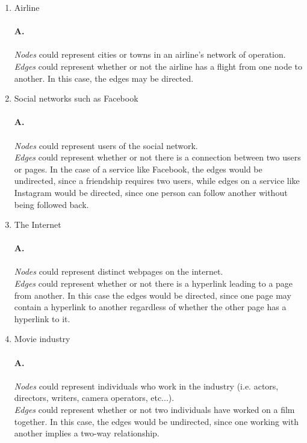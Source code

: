 \documentclass[12pt]{article}
\begin{document}
\begin{enumerate}
  \begin{enumerate}[label=(\alph*)]
    \item Airline
    \\\\
    \textbf{A.}
    \\\\
    \textit{Nodes} could represent cities or towns in an airline's network of operation.
    \\
    \textit{Edges} could represent whether or not the airline has a flight from one node to another. In this case, the edges may be directed.
    \\
    \item Social networks such as Facebook
    \\\\
    \textbf{A.}
    \\\\
    \textit{Nodes} could represent users of the social network.
    \\
    \textit{Edges} could represent whether or not there is a connection between two users or pages. In the case of a service like Facebook, the edges would be undirected, since a friendship requires two users, while edges on a service like Instagram would be directed, since one person can follow another without being followed back.
    \\
    \item The Internet
    \\\\
    \textbf{A.}
    \\\\
    \textit{Nodes} could represent distinct webpages on the internet.
    \\
    \textit{Edges} could represent whether or not there is a hyperlink leading to a page from another. In this case the edges would be directed, since one page may contain a hyperlink to another regardless of whether the other page has a hyperlink to it.
    \\
    \item Movie industry
    \\\\
    \textbf{A.}
    \\\\
    \textit{Nodes} could represent individuals who work in the industry (i.e. actors, directors, writers, camera operators, etc...).
    \\
    \textit{Edges} could represent whether or not two individuals have worked on a film together. In this case, the edges would be undirected, since one working with another implies a two-way relationship.

\end{enumerate}
\end{enumerate}
\end{document}
